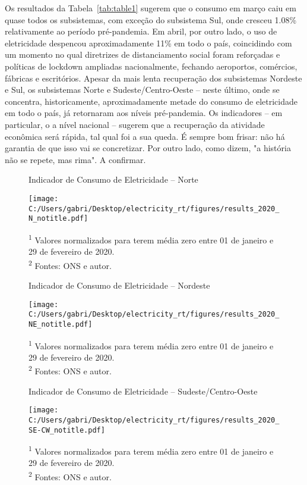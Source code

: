 \documentclass[12pt]{article}
\begin{document}
Os resultados da Tabela~{\ref{tab:table1}} sugerem que o consumo em março caiu em quase todos os subsistemas, com exceção do subsistema Sul, onde cresceu 1.08\% relativamente ao período pré-pandemia. Em abril, por outro lado, o uso de eletricidade despencou aproximadamente 11\% em todo o país, coincidindo com um momento no qual diretrizes de distanciamento social foram reforçadas e políticas de lockdown ampliadas nacionalmente, fechando aeroportos, comércios, fábricas e escritórios. Apesar da mais lenta recuperação dos subsistemas Nordeste e Sul, os subsistemas Norte e Sudeste/Centro-Oeste -- neste último, onde se concentra, historicamente, aproximadamente metade do consumo de eletricidade em todo o país, já retornaram aos níveis pré-pandemia. Os indicadores -- em particular, o a nível nacional -- sugerem que a recuperação da atividade econômica será rápida, tal qual foi a sua queda. É sempre bom frisar: não há garantia de que isso vai se concretizar. Por outro lado, como dizem, "a história não se repete, mas rima". A confirmar.

\begin{figure}[!htb]
	\centering
	\caption{Indicador de Consumo de Eletricidade -- Norte}
	\label{fig:figure2}
	\texttt{[image: C:/Users/gabri/Desktop/electricity\_rt/figures/results\_2020\_N\_notitle.pdf]}
	\caption*{\textsuperscript{1} Valores normalizados para terem média zero entre 01 de janeiro e 29 de fevereiro de 2020. \\ \textsuperscript{2} Fontes: ONS e autor.}
\end{figure}

\begin{figure}[!htb]
	\centering
	\caption{Indicador de Consumo de Eletricidade -- Nordeste}
	\label{fig:figure3}
	\texttt{[image: C:/Users/gabri/Desktop/electricity\_rt/figures/results\_2020\_NE\_notitle.pdf]}
	\caption*{\textsuperscript{1} Valores normalizados para terem média zero entre 01 de janeiro e 29 de fevereiro de 2020. \\ \textsuperscript{2} Fontes: ONS e autor.}
\end{figure}

\begin{figure}[!htb]
	\centering
	\caption{Indicador de Consumo de Eletricidade -- Sudeste/Centro-Oeste}
	\label{fig:figure4}
	\texttt{[image: C:/Users/gabri/Desktop/electricity\_rt/figures/results\_2020\_SE-CW\_notitle.pdf]}
	\caption*{\textsuperscript{1} Valores normalizados para terem média zero entre 01 de janeiro e 29 de fevereiro de 2020. \\ \textsuperscript{2} Fontes: ONS e autor.}
\end{figure}
\end{document}
